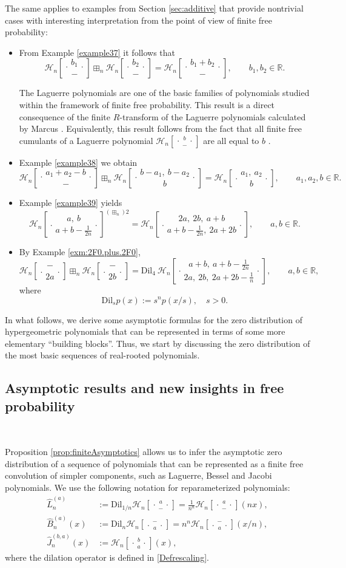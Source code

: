 \documentclass[reqno,11pt]{amsart}
\theoremstyle{remark}
\newcommand{\lag}{\widehat {L}}
\newcommand{\jac}{\widehat {J}}
\newcommand{\bes}{\widehat {B}}
\newcommand{\rr}{\mathbb{R}}
\newcommand*\HGP[3]{%
 \mathcal{H}_{#1}{\left[\genfrac..{0pt}{1}{#2}{#3}\right]}%
}
\begin{document}
The same applies to examples from Section \ref{sec:additive} that provide nontrivial cases with interesting interpretation from the point of view of finite free probability:
\begin{itemize}
\item From Example \ref{example37} it follows that 
$$
\HGP{n}{b_1}{-} \boxplus_n \HGP{n}{b_2}{-} = \HGP{n}{b_1+b_2}{-}, \qquad  b_1, b_2\in \rr.
$$

The Laguerre polynomials are one of the basic families of polynomials studied within the framework of finite free probability. This result is a direct consequence of the finite $R$-transform of the Laguerre polynomials calculated by Marcus \cite[Section 6.2.3]{marcus}. Equivalently, this result follows from the fact that all finite free cumulants of a Laguerre polynomial $\HGP{n}{b}{-}$ are all equal to $b$ \cite[Example 6.2]{arizmendi2018cumulants}. 

\item Example \ref{example38} we obtain
$$\HGP{n}{a_1+a_2-b}{-} \boxplus_n \HGP{n}{b-a_1,\ b-a_2}{b} = \HGP{n}{a_1,\ a_2}{b}, \qquad   a_1, a_2, b\in \rr.$$

\item Example \ref{example39} yields
$$\HGP{n}{a,\ b}{a+b-\tfrac{1}{2n}} ^{(\boxplus_n) 2} = \HGP{n}{2a,\ 2b,\ a+b}{a+b-\tfrac{1}{2n},\ 2a+2b}, \qquad  a, b\in \rr.$$

\item By Example \ref{exm:2F0.plus.2F0}, 
$$\HGP{n}{-}{2a} \boxplus_n \HGP{n}{-}{2b} = \text{Dil}_{4}\ \HGP{n}{a+b,\ a+b-\tfrac{1}{2n}}{2a,\ 2b,\ 2a+2b-\tfrac{1}{n}}, \qquad   a, b\in \rr,$$
where 
\begin{equation}
    \label{Defrescaling}
    \text{Dil}_{s} p(x):=s^n p(x/s), \quad s>0.
\end{equation}
\end{itemize}

In what follows, we derive some asymptotic formulas for the zero distribution of hypergeometric polynomials that can be represented in terms of some more elementary ``building blocks''. Thus, we start by discussing the zero distribution of the most basic sequences of real-rooted polynomials.

\subsection{Asymptotic results and new insights in free probability}\ 

Proposition \ref{prop:finiteAsymptotics} allows us to infer the asymptotic zero distribution of a sequence of polynomials that can be represented as a finite free convolution of simpler components, such as Laguerre, Bessel and Jacobi polynomials. We use the following notation for reparameterized polynomials:
\begin{align*}
\lag^{(a)}_n
&:= \text{Dil}_{1/n} \HGP{n}{a}{-} =\frac{1}{n^n} \HGP{n}{a}{-} (nx),\\
\bes^{(a)}_n(x)
&:= \text{Dil}_{n}  \HGP{n}{-}{a} =n^n \HGP{n}{-}{a} (x/n),\\
\jac^{(b,a)}_{n}(x)
&:= \HGP{n}{b}{a} (x), 
\end{align*}
where the dilation operator is defined in \eqref{Defrescaling}. 
\end{document}
